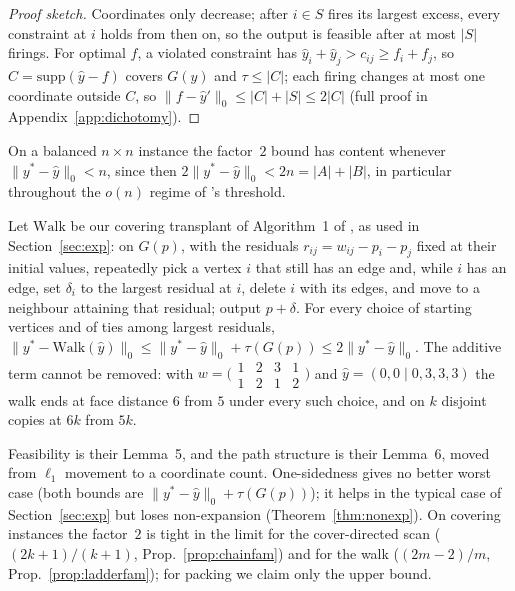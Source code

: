 \begin{proof}[Proof sketch]
Coordinates only decrease; after $i \in S$ fires its largest excess, every constraint at $i$ holds
from then on, so the output is feasible after at most $|S|$ firings. For optimal $f$, a violated
constraint has $\hat y_i + \hat y_j > c_{ij} \ge f_i + f_j$, so $C = \mathrm{supp}(\hat y - f)$
covers $G(\hat y)$ and $\tau \le |C|$; each firing changes at most one coordinate outside $C$, so
$\|f - \hat y'\|_0 \le |C| + |S| \le 2|C|$ (full proof in Appendix~\ref{app:dichotomy}).
\end{proof}

On a balanced $n \times n$ instance the factor~$2$ bound has content whenever
$\|y^* - \hat y\|_0 < n$, since then $2\|y^* - \hat y\|_0 < 2n = |A| + |B|$, in particular
throughout the $o(n)$ regime of \citeauthor{chen2022}'s threshold.

\begin{proposition}\label{prop:walkbound}
Let $\mathrm{Walk}$ be our covering transplant of Algorithm~1 of \citet{dinitz2021}, as used in
Section~\ref{sec:exp}: on $G(p)$, with the residuals $r_{ij} = w_{ij} - p_i - p_j$ fixed at their
initial values, repeatedly pick a vertex $i$ that still has an edge and, while $i$ has an edge,
set $\delta_i$ to the largest residual at $i$, delete $i$ with its edges, and move to a neighbour
attaining that residual; output $p + \delta$. For every choice of starting vertices and of ties
among largest residuals,
$\|y^* - \mathrm{Walk}(\hat y)\|_0 \le \|y^* - \hat y\|_0 + \tau(G(p)) \le 2\|y^* - \hat y\|_0$.
The additive term cannot be removed: with $w = \bigl(\begin{smallmatrix} 1 & 2 & 3 & 1 \\ 1 & 2 & 1 & 2 \end{smallmatrix}\bigr)$
and $\hat y = (0, 0 \mid 0, 3, 3, 3)$ the walk ends at face distance $6$ from $5$ under every
such choice, and on $k$ disjoint copies at $6k$ from $5k$.
\end{proposition}

Feasibility is their Lemma~5, and the path structure is their Lemma~6, moved from $\ell_1$
movement to a coordinate count. One-sidedness gives no better worst case (both bounds are
$\|y^* - \hat y\|_0 + \tau(G(p))$); it helps in the typical case of Section~\ref{sec:exp} but loses
non-expansion (Theorem~\ref{thm:nonexp}). On covering instances the factor~$2$ is tight in the limit for the
cover-directed scan ($(2k+1)/(k+1)$, Prop.~\ref{prop:chainfam}) and for the walk ($(2m-2)/m$,
Prop.~\ref{prop:ladderfam}); for packing we claim only the upper bound.

